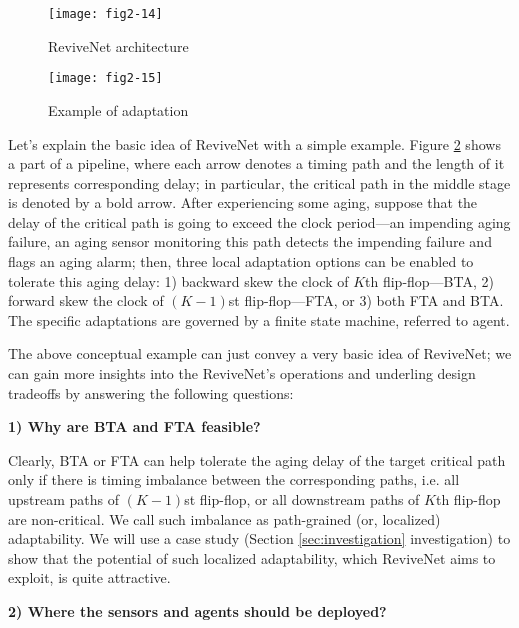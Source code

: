 \begin{figure}[t]
\centering
\texttt{[image: fig2-14]}%
   \caption{ReviveNet architecture}\label{syntop}
\end{figure}

\begin{figure}[h]
 \centering
  \texttt{[image: fig2-15]}%
  \caption{Example of adaptation}\label{ba_fa}
\end{figure}

Let's explain the basic idea of ReviveNet with a simple example. Figure \ref{ba_fa} shows a part of a pipeline, where each arrow denotes a timing path and the length of it represents corresponding delay; in particular, the critical path in the middle stage is denoted by a bold arrow. After experiencing some aging, suppose that the delay of the critical path is going to exceed the clock period---an impending aging failure, an aging sensor monitoring this path detects the impending failure \cite{agarwal2007circuit}\cite{SVFD_09} and flags an aging alarm; then, three local adaptation options can be enabled to tolerate this aging delay: 1) backward skew the clock of $K$th flip-flop---BTA, 2) forward skew the clock of $(K-1)$st flip-flop---FTA, or 3) both FTA and BTA. The specific adaptations are governed by a finite state machine, referred to agent.

The above conceptual example can just convey a very basic idea of ReviveNet; we can gain more insights into the ReviveNet's operations and underling design tradeoffs by answering the following questions:

{\bf 1) Why are BTA and FTA feasible?}

Clearly, BTA or FTA can help tolerate the aging delay of the target critical path only if there is timing imbalance between the corresponding paths, i.e. all upstream paths of $(K-1)$st flip-flop, or all downstream paths of $K$th flip-flop are non-critical. We call such imbalance as path-grained (or, localized) adaptability. We will use a case study (Section \ref{sec:investigation} investigation) to show that the potential of such localized adaptability, which ReviveNet aims to exploit, is quite attractive.

{\bf 2) Where the sensors and agents should be deployed?}


